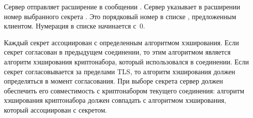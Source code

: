 Сервер отправляет расширение  в сообщении 
. Сервер указывает в расширении номер выбранного 
секрета . Это порядковый номер в списке 
, предложенным клиентом. Нумерация в списке  
начинается с~$0$.

Каждый секрет ассоциирован с определенным алгоритмом хэширования. 
%
Если секрет согласован в предыдущем соединении, то этим алгоритмом является
алгоритм хэширования криптонабора, который использовался в соединении.
%
Если секрет согласовывается за пределами TLS, то алгоритм хэширования должен 
определяться в момент согласования.
%
При выборе секрета сервер должен обеспечить его совместимость с криптонабором 
текущего соединения: алгоритм хэширования криптонабора должен совпадать с алгоритмом
хэширования, который ассоциирован с секретом.





